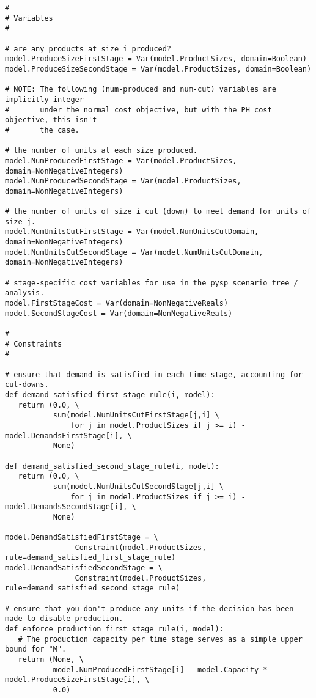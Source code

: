{\begin{verbatim}
#
# Variables
#

# are any products at size i produced?
model.ProduceSizeFirstStage = Var(model.ProductSizes, domain=Boolean)
model.ProduceSizeSecondStage = Var(model.ProductSizes, domain=Boolean)

# NOTE: The following (num-produced and num-cut) variables are implicitly integer
#       under the normal cost objective, but with the PH cost objective, this isn't
#       the case.

# the number of units at each size produced.
model.NumProducedFirstStage = Var(model.ProductSizes, domain=NonNegativeIntegers)
model.NumProducedSecondStage = Var(model.ProductSizes, domain=NonNegativeIntegers)

# the number of units of size i cut (down) to meet demand for units of size j.
model.NumUnitsCutFirstStage = Var(model.NumUnitsCutDomain, domain=NonNegativeIntegers)
model.NumUnitsCutSecondStage = Var(model.NumUnitsCutDomain, domain=NonNegativeIntegers)

# stage-specific cost variables for use in the pysp scenario tree / analysis.
model.FirstStageCost = Var(domain=NonNegativeReals)
model.SecondStageCost = Var(domain=NonNegativeReals)

#
# Constraints
#

# ensure that demand is satisfied in each time stage, accounting for cut-downs.
def demand_satisfied_first_stage_rule(i, model):
   return (0.0, \
           sum(model.NumUnitsCutFirstStage[j,i] \
               for j in model.ProductSizes if j >= i) - model.DemandsFirstStage[i], \
           None)

def demand_satisfied_second_stage_rule(i, model):
   return (0.0, \
           sum(model.NumUnitsCutSecondStage[j,i] \
               for j in model.ProductSizes if j >= i) - model.DemandsSecondStage[i], \
           None)

model.DemandSatisfiedFirstStage = \
                Constraint(model.ProductSizes, rule=demand_satisfied_first_stage_rule)
model.DemandSatisfiedSecondStage = \
                Constraint(model.ProductSizes, rule=demand_satisfied_second_stage_rule)

# ensure that you don't produce any units if the decision has been made to disable production.
def enforce_production_first_stage_rule(i, model):
   # The production capacity per time stage serves as a simple upper bound for "M".
   return (None, \
           model.NumProducedFirstStage[i] - model.Capacity * model.ProduceSizeFirstStage[i], \
           0.0)


\end{verbatim}}
